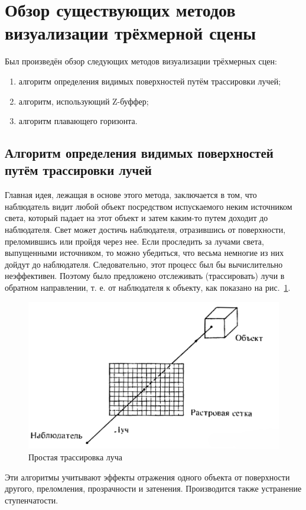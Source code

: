 \section{Обзор существующих методов визуализации трёхмерной сцены}
Был произведён обзор следующих методов визуализации трёхмерных сцен:
\begin{enumerate}[label={\arabic*)}]
	\item алгоритм определения видимых поверхностей путём трассировки лучей;
	\item алгоритм, использующий Z-буффер;
	\item алгоритм плавающего горизонта.
\end{enumerate}

\subsection{Алгоритм определения видимых поверхностей путём трассировки лучей}
Главная идея, лежащая в основе этого метода, заключается в том, что наблюдатель видит любой объект посредством испускаемого неким источником света, который падает на этот объект и затем каким-то путем доходит до наблюдателя. Свет может достичь наблюдателя, отразившись от поверхности, преломившись или пройдя через нее. Если проследить за лучами света, выпущенными источником, то можно убедиться, что весьма немногие из них дойдут до наблюдателя. Следовательно, этот процесс был бы вычислительно неэффективен. Поэтому было предложено отслеживать (трассировать) лучи в обратном направлении, т. е. от наблюдателя к объекту, как показано на рис.~\ref{fig:ray_tracing_pic}.
\begin{figure}[h]
	\centering
	\includegraphics[width=0.6\linewidth]{pictures/ray_tracing_pic.png}
	\caption{Простая трассировка луча}
	\label{fig:ray_tracing_pic}
\end{figure}

Эти алгоритмы учитывают эффекты отражения одного объекта от поверхности другого, преломления, прозрачности и затенения. Производится также устранение ступенчатости.

